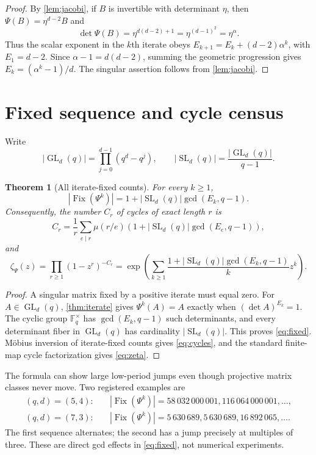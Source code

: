 \documentclass[11pt,a4paper]{amsart}
\newtheorem{theorem}{Theorem}[section]
\theoremstyle{definition}
\theoremstyle{remark}
\newcommand{\F}{\mathbb F}
\newcommand{\GL}{\operatorname{GL}}
\newcommand{\SL}{\operatorname{SL}}
\newcommand{\Fix}{\operatorname{Fix}}
\begin{document}
\begin{proof}
By \cref{lem:jacobi}, if $B$ is invertible with determinant $\eta$, then
$\Psi(B)=\eta^{d-2}B$ and
\[
 \det\Psi(B)=\eta^{d(d-2)+1}=\eta^{(d-1)^2}=\eta^\alpha.
\]
Thus the scalar exponent in the $k$th iterate obeys
$E_{k+1}=E_k+(d-2)\alpha^k$, with $E_1=d-2$.  Since
$\alpha-1=d(d-2)$, summing the geometric progression gives
$E_k=(\alpha^k-1)/d$.  The singular assertion follows from
\cref{lem:jacobi}.
\end{proof}

\section{Fixed sequence and cycle census}

Write
\begin{equation}\label{eq:group-sizes}
 |\GL_d(q)|=\prod_{j=0}^{d-1}(q^d-q^j),
 \qquad |\SL_d(q)|=\frac{|\GL_d(q)|}{q-1}.
\end{equation}

\begin{theorem}[All iterate-fixed counts]\label{thm:fixed}
For every $k\ge1$,
\begin{equation}\label{eq:fixed}
 \boxed{\displaystyle
 |\Fix(\Psi^k)|
 =1+|\SL_d(q)|\gcd(E_k,q-1).}
\end{equation}
Consequently, the number $C_r$ of cycles of exact length $r$ is
\begin{equation}\label{eq:cycles}
 C_r=\frac1r\sum_{e\mid r}\mu(r/e)
 \left(1+|\SL_d(q)|\gcd(E_e,q-1)\right),
\end{equation}
and
\begin{equation}\label{eq:zeta}
 \zeta_\Psi(z)=\prod_{r\ge1}(1-z^r)^{-C_r}
 =\exp\left(\sum_{k\ge1}
 \frac{1+|\SL_d(q)|\gcd(E_k,q-1)}{k}z^k\right).
\end{equation}
\end{theorem}

\begin{proof}
A singular matrix fixed by a positive iterate must equal zero.  For
$A\in\GL_d(q)$, \cref{thm:iterate} gives
$\Psi^k(A)=A$ exactly when $(\det A)^{E_k}=1$.  The cyclic group
$\F_q^\times$ has $\gcd(E_k,q-1)$ such determinants, and every determinant
fiber in $\GL_d(q)$ has cardinality $|\SL_d(q)|$.  This proves
\eqref{eq:fixed}.  M\"obius inversion of iterate-fixed counts gives
\eqref{eq:cycles}, and the standard finite-map cycle factorization gives
\eqref{eq:zeta}.
\end{proof}

The formula can show large low-period jumps even though projective matrix
classes never move.  Two registered examples are
\begin{align*}
 (q,d)=(5,4):&\quad
 |\Fix(\Psi^k)|=58\,032\,000\,001,
 116\,064\,000\,001,\ldots,\\
 (q,d)=(7,3):&\quad
 |\Fix(\Psi^k)|=5\,630\,689,5\,630\,689,
 16\,892\,065,\ldots.
\end{align*}
The first sequence alternates; the second has a jump precisely at multiples
of three.  These are direct gcd effects in \eqref{eq:fixed}, not numerical
experiments.
\end{document}
